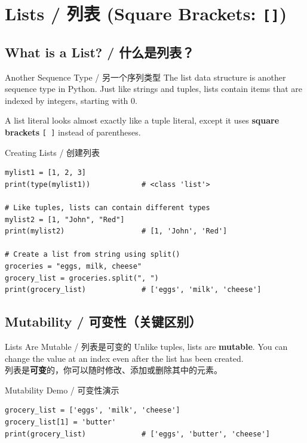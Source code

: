 \documentclass[11pt,a4paper]{article}
\begin{document}
\section{Lists / 列表 (Square Brackets: \texttt{[]})}

\subsection{What is a List? / 什么是列表？}

\begin{concept}{Another Sequence Type / 另一个序列类型}
    The list data structure is another sequence type in Python. Just like strings and tuples, lists contain items that are indexed by integers, starting with 0.

    A list literal looks almost exactly like a tuple literal, except it uses \textbf{square brackets} \texttt{[ ]} instead of parentheses.
\end{concept}

\begin{examplebox}{Creating Lists / 创建列表}
\begin{lstlisting}
mylist1 = [1, 2, 3]
print(type(mylist1))            # <class 'list'>

# Like tuples, lists can contain different types
mylist2 = [1, "John", "Red"]
print(mylist2)                  # [1, 'John', 'Red']

# Create a list from string using split()
groceries = "eggs, milk, cheese"
grocery_list = groceries.split(", ")
print(grocery_list)             # ['eggs', 'milk', 'cheese']
\end{lstlisting}
\end{examplebox}

\subsection{Mutability / 可变性（关键区别）}

\begin{concept}{Lists Are Mutable / 列表是可变的}
    Unlike tuples, lists are \textbf{mutable}. You can change the value at an index even after the list has been created. \\
    列表是\textbf{可变}的，你可以随时修改、添加或删除其中的元素。
\end{concept}

\begin{examplebox}{Mutability Demo / 可变性演示}
\begin{lstlisting}
grocery_list = ['eggs', 'milk', 'cheese']
grocery_list[1] = 'butter'
print(grocery_list)             # ['eggs', 'butter', 'cheese']
\end{lstlisting}
\end{examplebox}
\end{document}
